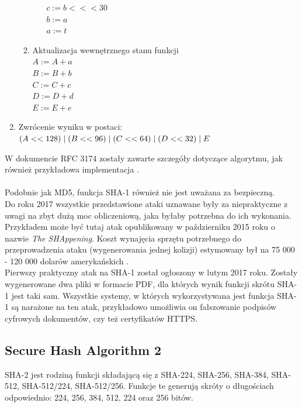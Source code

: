 \begin{enumerate}
\begin{enumerate}
\begin{enumerate}
				        $c := b <<< 30$\\
				        $b := a$ \\
				        $a := t$
				\end{enumerate}
			\item Aktualizacja wewnętrznego stanu funkcji \\
				$A := A + a$ \\
				$B := B + b$ \\
				$C := C + c$ \\
				$D := D + d$ \\
				$E := E + e$
		\end{enumerate}
	\item Zwrócenie wyniku w postaci: \\
		$(A << 128) \mathrel{|} (B << 96) \mathrel{|} (C << 64) \mathrel{|} (D << 32) \mathrel{|} E$
\end{enumerate}
W dokumencie RFC 3174 zostały zawarte szczegóły dotyczące algorytmu, jak również przykładowa implementacja \cite{sha1rfc}. \\ \\
Podobnie jak MD5, funkcja SHA-1 również nie jest uważana za bezpieczną. \\
Do roku 2017 wszystkie przedstawione ataki uznawane były za niepraktyczne z uwagi na zbyt dużą moc obliczeniową, jaka byłaby potrzebna do ich wykonania.
Przykładem może być tutaj atak opublikowany w październiku 2015 roku o nazwie \textit{The SHAppening}. Koszt wynajęcia sprzętu potrzebnego do przeprowadzenia ataku (wygenerowania jednej kolizji) estymowany był na 75 000 - 120 000 dolarów amerykańskich \cite{shap}. \\
Pierwszy praktyczny atak na SHA-1 został ogłoszony w lutym 2017 roku. Zostały wygenerowane dwa pliki w formacie PDF, dla których wynik funkcji skrótu SHA-1 jest taki sam. Wszystkie systemy, w których wykorzystywana jest funkcja SHA-1 są narażone na ten atak, przykładowo umożliwia on fałszowanie podpisów cyfrowych dokumentów, czy też certyfikatów HTTPS. \cite{shatt}

\subsection{Secure Hash Algorithm 2}
SHA-2 jest rodziną funkcji składającą się z \mbox{SHA-224}, \mbox{SHA-256}, \mbox{SHA-384}, \mbox{SHA-512}, \mbox{SHA-512/224}, \mbox{SHA-512/256}. Funkcje te generują skróty o długościach odpowiednio: 224, 256, 384, 512, 224 oraz 256 bitów.

